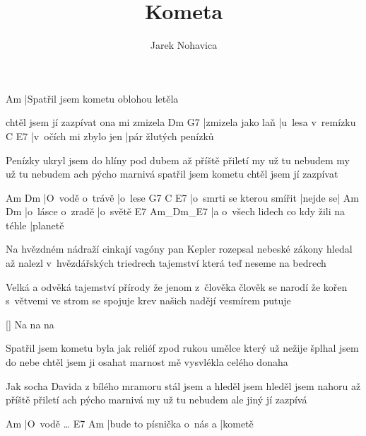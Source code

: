 \documentclass{song}
\title{Kometa}
\author{Jarek Nohavica}
\begin{document}
\strophe
Am
|Spatřil jsem kometu oblohou letěla

chtěl jsem jí zazpívat ona mi zmizela
Dm                G7
|zmizela jako laň |u~lesa v~remízku
C                     E7
|v~očích mi zbylo jen |pár žlutých penízků
\endstrophe

\strophe*
Penízky ukryl jsem do hlíny pod dubem
až příště přiletí my už tu nebudem
my už tu nebudem ach pýcho marnivá
spatřil jsem kometu chtěl jsem jí zazpívat
\endstrophe

Am              Dm
|O~vodě o~trávě |o~lese
G7                        C        E7
|o~smrti se kterou smířit |nejde se|
Am               Dm
|o~lásce o~zradě |o~světě
E7                                     Am_Dm_E7
|a o~všech lidech co kdy žili na téhle |planetě
\endstrophe

\strophe*
Na hvězdném nádraží cinkají vagóny
pan Kepler rozepsal nebeské zákony
hledal až nalezl v~hvězdářských triedrech
tajemství která teď neseme na bedrech
\endstrophe

\strophe*
Velká a odvěká tajemství přírody
že jenom z~člověka člověk se narodí
že kořen s~větvemi ve strom se spojuje
krev našich nadějí vesmírem putuje
\endstrophe

\ref{} Na na na

\strophe*
Spatřil jsem kometu byla jak reliéf
zpod rukou umělce který už nežije
šplhal jsem do nebe chtěl jsem ji osahat
marnost mě vysvlékla celého donaha
\endstrophe

\strophe*
Jak socha Davida z bílého mramoru
stál jsem a hleděl jsem hleděl jsem nahoru
až příště přiletí ach pýcho marnivá
my už tu nebudem ale jiný jí zazpívá
\endstrophe

Am
|O~vodě \ldots{}
E7                        Am
|bude to písnička o~nás a |kometě
\endstrophe
\end{document}
